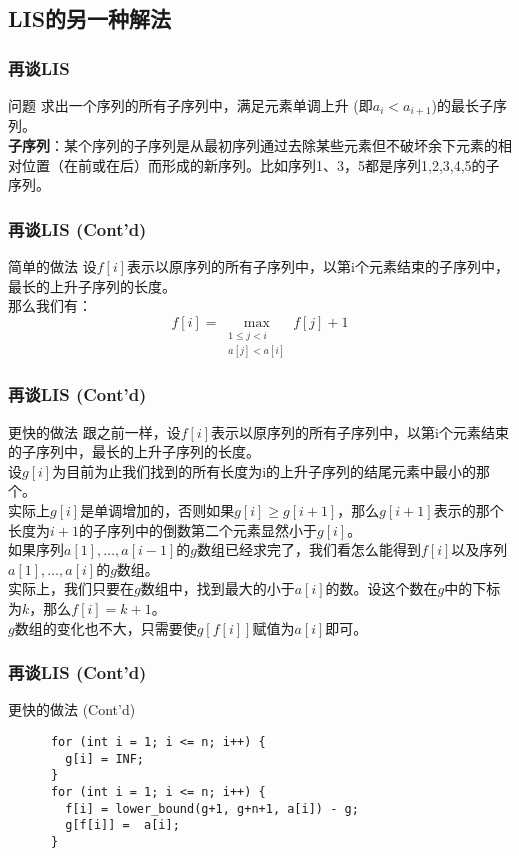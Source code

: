 \documentclass[hyperref={unicode=true}]{beamer}
\theoremstyle{definition}
\theoremstyle{proof}
\begin{document}
\subsection{LIS的另一种解法}
\begin{frame}\frametitle{再谈LIS}
  \begin{block}{问题}
    求出一个序列的所有子序列中，满足元素单调上升 (即$a_i<a_{i+1}$)的最长子序列。\\
    {\bf 子序列}：某个序列的子序列是从最初序列通过去除某些元素但不破坏余下元素的相对位置（在前或在后）而形成的新序列。比如序列{1}、{3，5}都是序列{1,2,3,4,5}的子序列。
  \end{block}
\end{frame}
\begin{frame}\frametitle{再谈LIS (Cont'd)}
  \begin{alertblock}{简单的做法}
    设$f[i]$表示以原序列的所有子序列中，以第i个元素结束的子序列中，最长的上升子序列的长度。\\
    那么我们有：
    \[f[i] = \max_{\substack{1 \leq j < i\\ a[j] < a[i]}}f[j]+1\]
  \end{alertblock}
\end{frame}
\begin{frame}\frametitle{再谈LIS (Cont'd)}
  \begin{exampleblock}{更快的做法}
    跟之前一样，设$f[i]$表示以原序列的所有子序列中，以第i个元素结束的子序列中，最长的上升子序列的长度。\\
    设$g[i]$为目前为止我们找到的所有长度为i的上升子序列的结尾元素中最小的那个。\\
    实际上$g[i]$是单调增加的，否则如果$g[i]\geq g[i+1]$，那么$g[i+1]$表示的那个长度为$i+1$的子序列中的倒数第二个元素显然小于$g[i]$。\\
    \pause{}如果序列$a[1],\ldots,a[i-1]$的$g$数组已经求完了，我们看怎么能得到$f[i]$以及序列$a[1],\ldots,a[i]$的$g$数组。\\
    实际上，我们只要在$g$数组中，找到最大的小于$a[i]$的数。设这个数在$g$中的下标为$k$，那么$f[i]=k+1$。\\
    $g$数组的变化也不大，只需要使$g[f[i]]$赋值为$a[i]$即可。
  \end{exampleblock}
\end{frame}
\begin{frame}[fragile]\frametitle{再谈LIS (Cont'd)}
  \begin{exampleblock}{更快的做法 (Cont'd)}
    \begin{verbatim}
      for (int i = 1; i <= n; i++) {
        g[i] = INF;
      }
      for (int i = 1; i <= n; i++) {
        f[i] = lower_bound(g+1, g+n+1, a[i]) - g;
        g[f[i]] =  a[i];
      }
    \end{verbatim}
  \end{exampleblock}
\end{frame}
\end{document}
